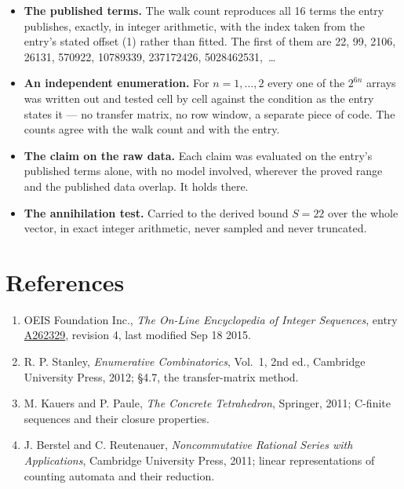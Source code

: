 \documentclass[11pt]{article}
\theoremstyle{definition}
\begin{document}
\begin{itemize}

\item {\bfseries The published terms.} The walk count reproduces all 16 terms the entry publishes, exactly, in integer arithmetic, with the index taken from the entry's stated offset (1) rather than fitted. The first of them are 22, 99, 2106, 26131, 570922, 10789339, 237172426, 5028462531,~\dots

\item {\bfseries An independent enumeration.} For $n = 1,\dots,2$ every one of the $2^{6n}$ arrays was written out and tested cell by cell against the condition as the entry states it --- no transfer matrix, no row window, a separate piece of code. The counts agree with the walk count and with the entry.

\item {\bfseries The claim on the raw data.} Each claim was evaluated on the entry's published terms alone, with no model involved, wherever the proved range and the published data overlap. It holds there.

\item {\bfseries The annihilation test.} Carried to the derived bound $S = 22$ over the whole vector, in exact integer arithmetic, never sampled and never truncated.

\end{itemize}

\section{References}

\begin{enumerate}

\item OEIS Foundation Inc., \emph{The On-Line Encyclopedia of Integer Sequences}, entry \href{https://oeis.org/A262329}{A262329}, revision 4, last modified Sep 18 2015.

\item R. P. Stanley, \emph{Enumerative Combinatorics}, Vol.~1, 2nd ed., Cambridge University Press, 2012; \S4.7, the transfer-matrix method.

\item M. Kauers and P. Paule, \emph{The Concrete Tetrahedron}, Springer, 2011; C-finite sequences and their closure properties.

\item J. Berstel and C. Reutenauer, \emph{Noncommutative Rational Series with Applications}, Cambridge University Press, 2011; linear representations of counting automata and their reduction.

\end{enumerate}
\end{document}
